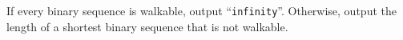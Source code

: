 
If every binary sequence is walkable, output ``\texttt{infinity}''.
Otherwise, output the length of a shortest binary sequence that is not walkable.
